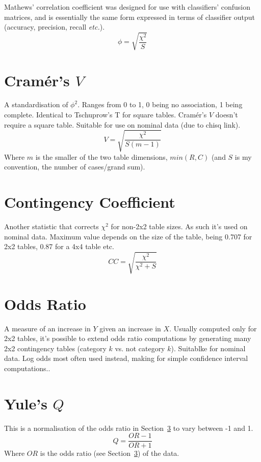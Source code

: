 \documentclass[11pt]{article}
\begin{document}
Mathews' correlation coefficient was designed for use with classifiers' confusion matrices, and is essentially the same form expressed in terms of classifier output (accuracy, precision, recall \textsl{etc.}). 
$$
\phi = \sqrt{ \frac{\chi^2}{S} }
$$




\section{Cram\'er's $V$}
A standardisation of $\phi^2$.  Ranges from 0 to 1, 0 being no association, 1 being complete.  Identical to Tschuprow's T for square tables.  Cram\'er's $V$ doesn't require a square table.  Suitable for use on nominal data (due to chisq link).
$$
V = \sqrt{ \frac{ \chi^2 }{ S( m - 1 )} }
$$
Where $m$ is the smaller of the two table dimensions, $min(R, C)$  (and $S$ is my convention, the number of cases/grand sum).




\section{Contingency Coefficient}
Another statistic that corrects $\chi^2$ for non-2x2 table sizes.  As such it's used on nominal data.  Maximum value depends on the size of the table, being 0.707 for 2x2 tables, 0.87 for a 4x4 table etc.  
$$
CC = \sqrt{ \frac{ \chi^2 }{ \chi^2 + S } }
$$




\section{Odds Ratio}
\label{section:oddsratio}
A measure of an increase in $Y$ given an increase in $X$. %
Usually computed only for 2x2 tables, it's possible to extend odds ratio computations by generating many 2x2 contingency tables (category $k$ vs. not category $k$).  Suitablke for nominal data.  %
Log odds most often used instead, making for simple confidence interval computations..




\section{Yule's $Q$}
This is a normalisation of the odds ratio in Section~\ref{section:oddsratio} to vary between -1 and 1.
$$
Q = \frac{OR - 1}{OR + 1}
$$
Where $OR$ is the odds ratio (see Section~\ref{section:oddsratio}) of the data.
\end{document}
